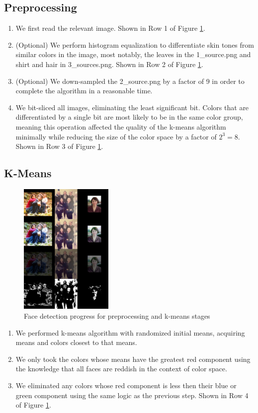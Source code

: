 \documentclass[conference]{IEEEtran}
\begin{document}
\subsection{Preprocessing}
\begin{enumerate}
	\item \label{step:A1} We first read the relevant image. Shown in Row 1 of Figure \ref{fig:pro1}.
	\item \label{step:A2} (Optional) We perform histogram equalization to differentiate skin tones from similar colors in the image, most notably, the leaves in the 1\_source.png and shirt and hair in 3\_sources.png. Shown in Row 2 of Figure \ref{fig:pro1}.
	\item \label{step:A3} (Optional) We down-sampled the 2\_source.png by a factor of 9 in order to complete the algorithm in a reasonable time. 
	\item \label{step:A4} We bit-sliced all images, eliminating the least significant bit. Colors that are differentiated by a single bit are most likely to be in the same color group, meaning this operation affected the quality of the k-means algorithm minimally while reducing the size of the color space by a factor of $2^3=8$. Shown in Row 3 of Figure \ref{fig:pro1}.
\end{enumerate}
\subsection{K-Means}
\begin{figure}[h]
    \centering
    \includegraphics[width=0.4\textwidth]{resources/Progress 1.jpeg}
    \caption{Face detection progress for preprocessing and k-means stages}
    \label{fig:pro1}
\end{figure}
\begin{enumerate}
	\item \label{step:B1} We performed k-means algorithm with randomized initial means, acquiring means and colors closest to that means.
	\item \label{step:B2} We only took the colors whose means have the greatest red component using the knowledge that all faces are reddish in the context of color space.
	\item \label{step:B3} We eliminated any colors whose red component is less then their blue or green component using the same logic as the previous step. Shown in Row 4 of Figure \ref{fig:pro1}.
\end{enumerate}
\end{document}
